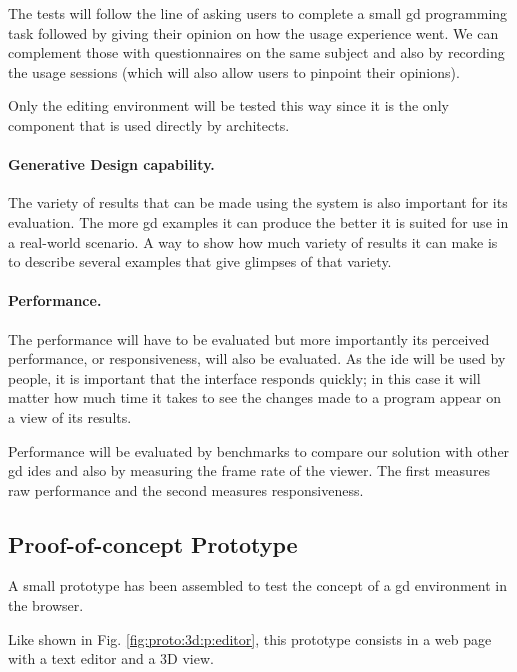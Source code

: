 \documentclass{./llncs2e/llncs}
\begin{document}
	The tests will follow the line of asking users to complete a small \ac{gd} programming task followed by giving their opinion on how the usage experience went.
	We can complement those with questionnaires on the same subject and also by recording the usage sessions (which will also allow users to pinpoint their opinions).
	
	Only the editing environment will be tested this way since it is the only component that is used directly by architects.
	
	\paragraph{Generative Design capability.}
	The variety of results that can be made using the system is also important for its evaluation.
	The more \ac{gd} examples it can produce the better it is suited for use in a real-world scenario.
	A way to show how much variety of results it can make is to describe several examples that give glimpses of that variety.
	
	\paragraph{Performance.}
	The performance will have to be evaluated but more importantly its perceived performance, or responsiveness, will also be evaluated.
	As the \ac{ide} will be used by people, it is important that the interface responds quickly;
	in this case it will matter how much time it takes to see the changes made to a program appear on a view of its results.
	
	Performance will be evaluated by benchmarks to compare our solution with other \ac{gd} \ac{ide}s and also by measuring the frame rate of the viewer.
	The first measures raw performance and the second measures responsiveness.

\subsection{Proof-of-concept Prototype}
	A small prototype has been assembled to test the concept of a \ac{gd} environment in the browser.

	Like shown in Fig. \ref{fig:proto:3d:p:editor}, this prototype consists in a web page with a text editor and a 3D view.
\end{document}
